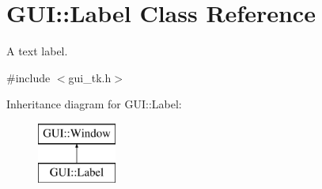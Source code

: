 \hypertarget{classGUI_1_1Label}{\section{G\-U\-I\-:\-:Label Class Reference}
\label{classGUI_1_1Label}
}


A text label.  




{\ttfamily \#include $<$gui\-\_\-tk.\-h$>$}

Inheritance diagram for G\-U\-I\-:\-:Label\-:\begin{figure}[H]
\begin{center}
\leavevmode
\includegraphics[height=2.000000cm]{classGUI_1_1Label}
\end{center}
\end{figure}
